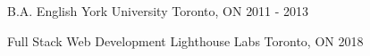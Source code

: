 

\begin{cventries}

  \cventry
    {B.A. English} %
    {York University} %
    {Toronto, ON} %
    {2011 - 2013} %
    {
\newline
    }
    
\vspace{-0.7cm}

\cventry
{Full Stack Web Development} %
{Lighthouse Labs} %
{Toronto, ON} %
{2018} %
{
}
\vspace{-0.7cm}
\end{cventries}
